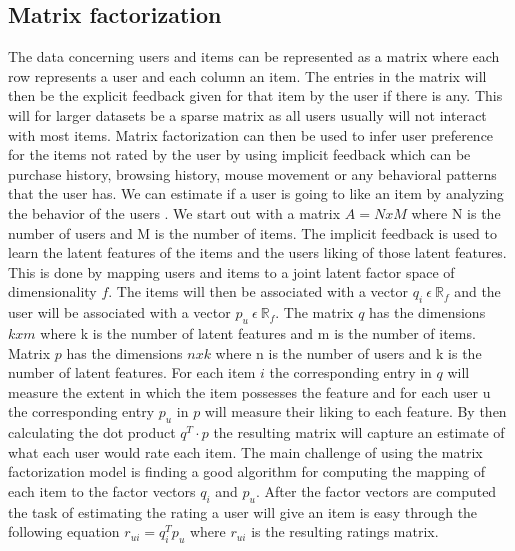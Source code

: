 \subsection{Matrix factorization}\label{bsc::MF}
The data concerning users and items can be represented as a matrix where each row represents a user and each column an item.
The entries in the matrix will then be the explicit feedback given for that item by the user if there is any.
This will for larger datasets be a sparse matrix as all users usually will not interact with most items.
Matrix factorization can then be used to infer user preference for the items not rated by the user by using implicit feedback which can be purchase history, browsing history, mouse movement or any behavioral patterns that the user has.
We can estimate if a user is going to like an item by analyzing the behavior of the users \cite{Matrix-factorization-techniques}.
We start out with a matrix $A = N x M$ where N is the number of users and M is the number of items.
The implicit feedback is used to learn the latent features of the items and the users liking of those latent features.
This is done by mapping users and items to a joint latent factor space of dimensionality $f$.
The items will then be associated with a vector $q_i \: \epsilon \: \mathbb{R}_f$ and the user will be associated with a vector $p_u \: \epsilon \: \mathbb{R}_f$.
The matrix $q$ has the dimensions $k x m$ where k is the number of latent features and m is the number of items.
Matrix $p$ has the dimensions $n x k$ where n is the number of users and k is the number of latent features.
For each item $i$ the corresponding entry in $q$ will measure the extent in which the item possesses the feature and for each user u the corresponding entry $p_u$ in $p$ will measure their liking to each feature.
By then calculating the dot product $q^T \cdot p$ the resulting matrix will capture an estimate of what each user would rate each item.
The main challenge of using the matrix factorization model is finding a good algorithm for computing the mapping of each item to the factor vectors $q_i$ and $p_u$.
After the factor vectors are computed the task of estimating the rating a user will give an item is easy through the following equation $r_{ui} = q_i^T p_u$ where $r_{ui}$ is the resulting ratings matrix.

